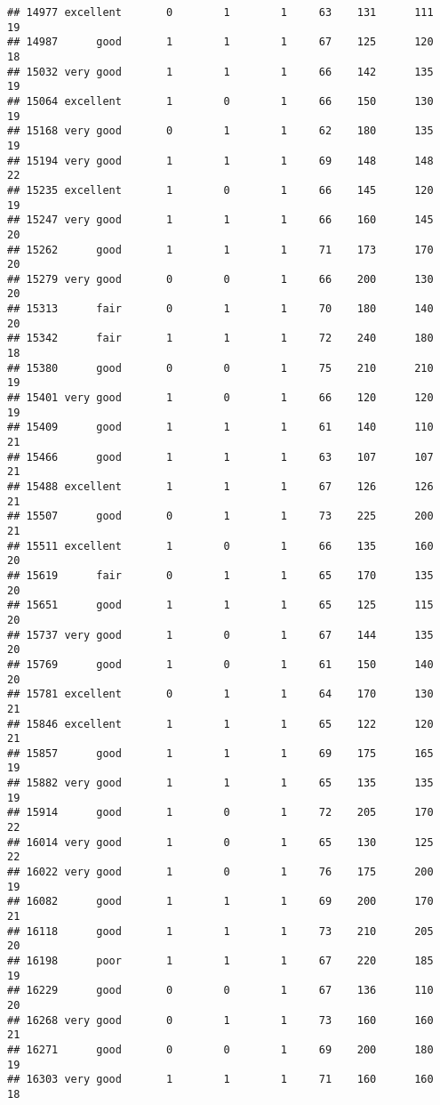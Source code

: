 \documentclass[]{article}
\begin{document}
\begin{verbatim}
## 14977 excellent       0        1        1     63    131      111  19
## 14987      good       1        1        1     67    125      120  18
## 15032 very good       1        1        1     66    142      135  19
## 15064 excellent       1        0        1     66    150      130  19
## 15168 very good       0        1        1     62    180      135  19
## 15194 very good       1        1        1     69    148      148  22
## 15235 excellent       1        0        1     66    145      120  19
## 15247 very good       1        1        1     66    160      145  20
## 15262      good       1        1        1     71    173      170  20
## 15279 very good       0        0        1     66    200      130  20
## 15313      fair       0        1        1     70    180      140  20
## 15342      fair       1        1        1     72    240      180  18
## 15380      good       0        0        1     75    210      210  19
## 15401 very good       1        0        1     66    120      120  19
## 15409      good       1        1        1     61    140      110  21
## 15466      good       1        1        1     63    107      107  21
## 15488 excellent       1        1        1     67    126      126  21
## 15507      good       0        1        1     73    225      200  21
## 15511 excellent       1        0        1     66    135      160  20
## 15619      fair       0        1        1     65    170      135  20
## 15651      good       1        1        1     65    125      115  20
## 15737 very good       1        0        1     67    144      135  20
## 15769      good       1        0        1     61    150      140  20
## 15781 excellent       0        1        1     64    170      130  21
## 15846 excellent       1        1        1     65    122      120  21
## 15857      good       1        1        1     69    175      165  19
## 15882 very good       1        1        1     65    135      135  19
## 15914      good       1        0        1     72    205      170  22
## 16014 very good       1        0        1     65    130      125  22
## 16022 very good       1        0        1     76    175      200  19
## 16082      good       1        1        1     69    200      170  21
## 16118      good       1        1        1     73    210      205  20
## 16198      poor       1        1        1     67    220      185  19
## 16229      good       0        0        1     67    136      110  20
## 16268 very good       0        1        1     73    160      160  21
## 16271      good       0        0        1     69    200      180  19
## 16303 very good       1        1        1     71    160      160  18

\end{verbatim}
\end{document}

